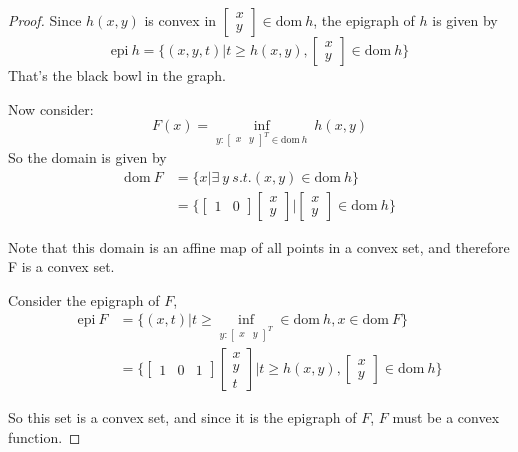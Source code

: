 \begin{proof}
	Since $h(x,y)$ is convex in 
	$\begin{bmatrix}
	x\\
	y
	\end{bmatrix}
	\in \text{dom}\ h$, the epigraph of $h$ is given by 
	\begin{equation*}
	\text{epi}\ h = \{(x,y,t)|t\geq h(x,y), \begin{bmatrix}
	x\\
	y
	\end{bmatrix}\in \text{dom}\ h \}
	\end{equation*}
	That's the black bowl in the graph. 
	
	Now consider:
	\begin{equation*}
	F(x) = \inf_{y:
		\begin{bmatrix}
		x&y
		\end{bmatrix}^T
		\in \text{dom}\ h}
	\ h(x,y)
	\end{equation*}
	So the domain is given by
	\begin{align*}
	\text{dom}\ F &= \{x|\exists\ y\ s.t. (x,y)\in \text{dom}\ h \}\\
	&= \{\begin{bmatrix}
	1&0
	\end{bmatrix}
	\begin{bmatrix}
	x\\
	y
	\end{bmatrix} 
	|
	\begin{bmatrix}
	x\\
	y
	\end{bmatrix}\in \text{dom}\ h \}
	\end{align*}
	
	Note that this domain is an affine map of all points in a convex set, and therefore  F is a convex set.
	
	Consider the epigraph of $F$,
\begin{align*}
\text{epi}\ F 
&= \{(x,t)|t\geq \inf_{y:
	\begin{bmatrix}
	x&y
	\end{bmatrix}^T
}
\in \text{dom}\ h, x\in \text{dom}\ F \}\\
&= \{
\begin{bmatrix}
1&0&1
\end{bmatrix}
\begin{bmatrix}
x\\
y\\
t
\end{bmatrix}
\vert t\geq h(x,y), 
\begin{bmatrix}
x\\
y
\end{bmatrix}\in \text{dom}\ h \}
\end{align*}

So this set is a convex set, and since it is the epigraph of $F$, $F$ must be a convex function. 

\end{proof}


